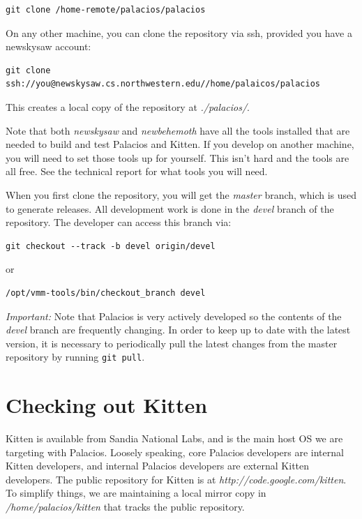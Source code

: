 \documentclass[11pt]{article}
\begin{document}
\begin{verbatim}
git clone /home-remote/palacios/palacios
\end{verbatim}


On any other machine, you can clone the repository via ssh, provided
you have a newskysaw account:
 
\begin{verbatim}
git clone ssh://you@newskysaw.cs.northwestern.edu//home/palaicos/palacios
\end{verbatim}

This creates a local copy of the repository at {\em ./palacios/}.

Note that both {\em newskysaw} and {\em newbehemoth} have all the
tools installed that are needed to build and test Palacios and Kitten.
If you develop on another machine, you will need to set those tools up
for yourself.  This isn't hard and the tools are all free.  See the
technical report for what tools you will need.

When you first clone the repository, you will get the {\em master}
branch, which is used to generate releases.   All development work is
done in the {\em devel} branch of the repository. The developer can
access this branch via:

\begin{verbatim}
git checkout --track -b devel origin/devel
\end{verbatim}

or 

\begin{verbatim}
/opt/vmm-tools/bin/checkout_branch devel
\end{verbatim}

{\em Important:}
Note that Palacios is very actively developed so the contents of the
{\em devel} branch are frequently changing. In order to keep up to
date with the latest version, it is necessary to periodically pull the
latest changes from the master repository by running \verb.git pull..



\section{Checking out Kitten}

Kitten is available from Sandia National Labs, and is the main host OS
we are targeting with Palacios. Loosely speaking, core Palacios
developers are internal Kitten developers, and internal Palacios
developers are external Kitten developers. The public repository for
Kitten is at {\em http://code.google.com/kitten}.  To simplify things,
we are maintaining a local mirror copy in {\em /home/palacios/kitten}
that tracks the public repository.
\end{document}
